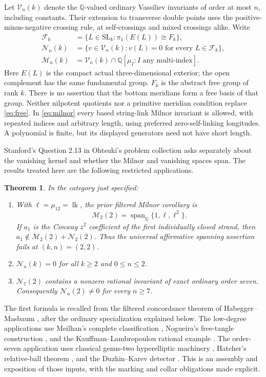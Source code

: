 \documentclass[11pt]{article}
\newtheorem{theorem}{Theorem}
\theoremstyle{remark}\newtheorem{remark}[theorem]{Remark}
\newcommand{\Q}{\mathbb Q}
\newcommand{\SL}{\mathrm{SL}}
\newcommand{\V}{\mathcal V}
\newcommand{\M}{\mathcal M}
\newcommand{\N}{\mathcal N}
\newcommand{\F}{\mathcal F}
\newcommand{\lk}{\operatorname{lk}}
\begin{document}
Let $\V_n(k)$ denote the $\Q$-valued ordinary Vassiliev invariants of order
at most $n$, including constants. Their extension to transverse double
points uses the positive-minus-negative crossing rule, at self-crossings
and mixed crossings alike. Write
\begin{align}
\F_k&=\{L\in\SL_k:\pi_1(E(L))\cong F_k\},\label{eq:free}\\
\N_n(k)&=\{v\in\V_n(k):v(L)=0\text{ for every }L\in\F_k\},\label{eq:kernel}\\
\M_n(k)&=\V_n(k)\cap\Q[\mu_I:I\text{ any multi-index}].\label{eq:milnor}
\end{align}
Here $E(L)$ is the compact actual three-dimensional exterior; the open
complement has the same fundamental group. $F_k$ is the abstract free
group of rank $k$. There is no assertion that the bottom meridians form
a free basis of that group. Neither nilpotent quotients nor a primitive
meridian condition replace \eqref{eq:free}. In \eqref{eq:milnor} every
based string-link Milnor invariant is allowed, with repeated indices and
arbitrary length, using preferred zero-self-linking longitudes. A polynomial
is finite, but its displayed generators need not have short length.

Stanford's Question 2.13 in Ohtsuki's problem collection
\cite[\S2.6, p.~408]{Ohtsuki} asks separately about the vanishing kernel
and whether the Milnor and vanishing spaces span. The results treated here
are the following restricted applications.
\begin{theorem}\label{thm:main}
In the category just specified:
\begin{enumerate}
\item With $\ell=\mu_{12}=\lk$, the prior filtered Milnor corollary is
\[
\M_2(2)=\operatorname{span}_{\Q}\{1,\ell,\ell^2\}.
\]
If $a_1$ is the Conway $z^2$ coefficient of the first individually closed
strand, then $a_1\notin\M_2(2)+\N_2(2)$. Thus the universal affirmative
spanning assertion fails at $(k,n)=(2,2)$.
\item $\N_n(k)=0$ for all $k\geq2$ and $0\leq n\leq2$.
\item $\N_7(2)$ contains a nonzero rational invariant of exact ordinary
order seven. Consequently $\N_n(2)\ne0$ for every $n\geq7$.
\end{enumerate}
\end{theorem}
The first formula is recalled from the filtered concordance theorem of
Habegger--Masbaum \cite[Corollary 6.4 and Theorem 15.1]{HM}, after the
ordinary specialization explained below. The low-degree applications use
Meilhan's complete classification \cite{Meilhan}, Nogueira's free-tangle
construction \cite{Nogueira14}, and the Kauffman--Lambropoulou rational
example \cite{KL,KLDNA}. The order-seven application uses classical
genus-two hyperelliptic machinery \cite{BleilerMoriah,RS,BM}, Hatcher's
relative-ball theorem \cite{HatcherSmale}, and the Duzhin--Karev detector
\cite{DKv5}. This is an assembly and exposition of those inputs, with the
marking and collar obligations made explicit.
\end{document}
